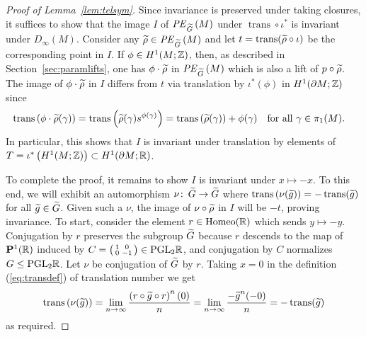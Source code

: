 \documentclass[tikz, sepfignums, defaultenums]{nmd/article}
\newcommand{\G}{G}
\newcommand{\RGtilPE}[1]{\mathit{PE}_{\Gtil}\left(#1\right)}
\newcommand{\inc}{\iota}
\newcommand{\projsp}{\P}
\DeclareMathOperator{\trans}{trans}
\newcommand{\SymTEL}[1]{D_\infty\left(#1\right)}
\begin{document}
\begin{proof}[Proof of Lemma~\ref{lem:telsym}]
Since invariance is preserved under taking closures, it suffices to
show that the image $I$ of $\RGtilPE{M}$ under $\trans \circ \inc^*$
is invariant under $\SymTEL{M}$.  Consider any
$\rhotil \in \RGtilPE{M}$ and let $t = \trans(\rhotil \circ \inc)$ be
the corresponding point in $I$.  If $\phi \in H^1(M; {\mathbb Z})$, then, as
described in Section~\ref{sec:paramlifts}, one has
$\phi \cdot \rhotil$ in $\RGtilPE{M}$ which is also a lift of
$p \circ \rhotil$.  The image of $\phi \cdot \rhotil$ in $I$ differs
from $t$ via translation by $\inc^*(\phi)$ in $H^1(\partial M; {\mathbb Z})$
since
\[
\trans\left(\phi \cdot \rhotil(\gamma)\right) = 
\trans\left(\rhotil(\gamma) s^{\phi(\gamma)} \right) =
\trans\left(\rhotil(\gamma)\right) + \phi(\gamma) 
\mtext{for all $\gamma \in \pi_1(M)$.}
\]
  In particular, this shows
that $I$ is invariant under translation by elements of
$T = \inc^*\left(H^1(M; \Z)\right) \subset H^1(\partial M; \R)$.

To complete the proof, it remains to show $I$ is invariant under
$x \mapsto -x$.  To this end, we will exhibit an automorphism
$\nu \maps \Gtil \to \Gtil$ where
$\trans\left(\nu(\gtil)\right) = -\trans(\gtil)$ for all
$\gtil \in \Gtil$.  Given such a $\nu$, the image of
$\nu \circ \rhotil$ in $I$ will be $-t$, proving invariance.  To
start, consider the element $r \in \operatorname{Homeo}({\mathbb R})$ which sends
$y \mapsto -y$.  Conjugation by $r$ preserves the subgroup $\Gtil$
because $r$ descends to the map of $\projsp^1(\R)$ induced by
$C = \left(\begin{smallmatrix} \scriptstyle 1 & \scriptstyle 0 \\ \scriptstyle 0 & \scriptstyle -1 \end{smallmatrix}\right) \in \mathrm{PGL}_{2} {\mathbb R}$, and conjugation by
$C$ normalizes $\G \leq \PGL{2}{\R}$.  Let $\nu$ be conjugation of
$\Gtil$ by $r$.  Taking $x = 0$ in the definition (\ref{eq:transdef})
of translation number we get
\[
\trans\left(\nu(\gtil)\right) = \lim_{n \to \infty} \frac{
  \left(r \circ \gtil \circ r\right)^n(0)}{n} = \lim_{n \to \infty}
\frac{-\gtil^n(-0)}{n} = -\trans(\gtil)
\]
as required. 
\end{proof}
\end{document}
